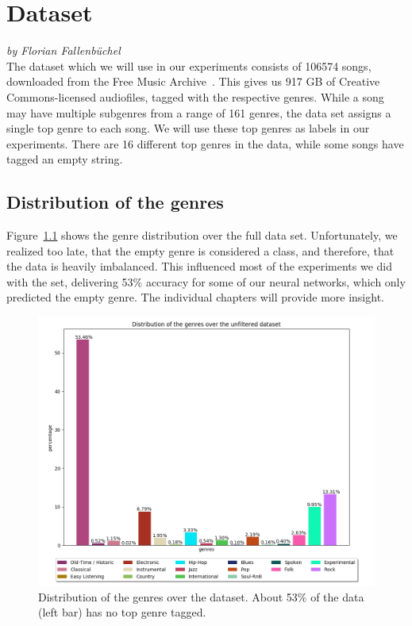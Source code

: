 \chapter{Dataset}\label{dataset}
\textit{by Florian Fallenbüchel}\\
The dataset which we will use in our experiments consists of 106574
songs, downloaded from the Free Music Archive~\cite{fma_dataset}. This
gives us 917 GB of Creative Commons-licensed audiofiles, tagged with the
respective genres. While a song may have multiple subgenres from a range
of 161 genres, the data set assigns a single top genre to each song. We
will use these top genres as labels in our experiments. There are 16
different top genres in the data, while some songs have tagged an empty
string.

\section{Distribution of the genres}

Figure~\ref{unfiltered} shows the genre distribution over the
full data set. Unfortunately, we realized too late, that the empty genre
is considered a class, and therefore, that the data is heavily
imbalanced. This influenced most of the experiments we did with the set,
delivering 53$\%$ accuracy for some of our neural networks, which only
predicted the empty genre. The individual chapters will provide more
insight.

\begin{figure}[!htb]
	\centering
	\includegraphics[width=1.0\textwidth]{images/genredist.png}
	\caption{Distribution of the genres over the dataset.
	About 53$\%$ of the data (left bar) has no top genre tagged.}
	\label{unfiltered}
\end{figure}

